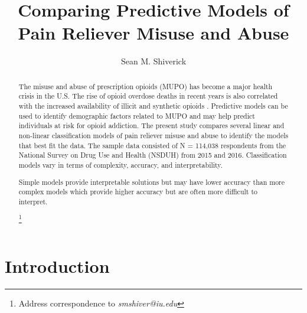 \documentclass[sigconf]{acmart}
\begin{document}
  \title{Comparing Predictive Models of Pain Reliever Misuse and Abuse}
  \author{Sean M. Shiverick}
\renewcommand{\shortauthors}{S.M. Shiverick}


\begin{abstract}

The misuse and abuse of prescription opioids (MUPO) has become a major health 
crisis in the U.S. The rise of opioid overdose deaths in recent years is also 
correlated with the increased availability of illicit and synthetic opioids
\cite{nida18}. Predictive models can be used to identify demographic factors 
related to MUPO and may help predict individuals at risk for opioid addiction.
The present study compares several linear and non-linear classification models 
of pain reliever misuse and abuse to identify the models that best fit the data. 
The sample data consisted of N = 114,038 respondents from the National Survey 
on Drug Use and Health (NSDUH) from 2015 and 2016. Classification models 
vary in terms of complexity, accuracy, and interpretability. 

Simple models provide interpretable solutions but may have lower accuracy 
than more complex models which provide higher accuracy but are often more 
difficult to interpret.   

\footnote{ Address correspondence to \textit{smshiver@iu.edu}}
\end{abstract}
\maketitle

\section{Introduction}
\end{document}
